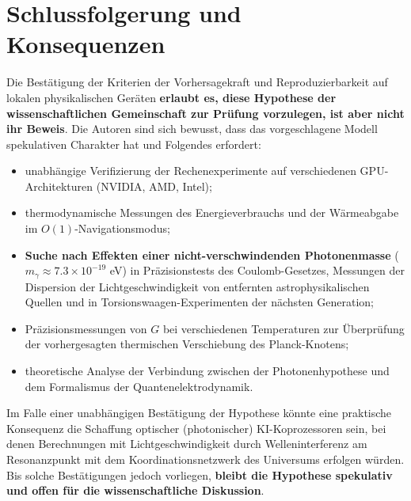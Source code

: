 \documentclass[11pt,a4paper]{article}
\begin{document}
	\section{Schlussfolgerung und Konsequenzen}
	Die Bestätigung der Kriterien der Vorhersagekraft und Reproduzierbarkeit auf lokalen physikalischen Geräten \textbf{erlaubt es, diese Hypothese der wissenschaftlichen Gemeinschaft zur Prüfung vorzulegen, ist aber nicht ihr Beweis}. Die Autoren sind sich bewusst, dass das vorgeschlagene Modell spekulativen Charakter hat und Folgendes erfordert:
	\begin{itemize}
		\item unabhängige Verifizierung der Rechenexperimente auf verschiedenen GPU-Architekturen (NVIDIA, AMD, Intel);
		\item thermodynamische Messungen des Energieverbrauchs und der Wärmeabgabe im $O(1)$-Navigationsmodus;
		\item \textbf{Suche nach Effekten einer nicht-verschwindenden Photonenmasse} ($m_\gamma \approx 7.3 \times 10^{-19}$ eV) in Präzisionstests des Coulomb-Gesetzes, Messungen der Dispersion der Lichtgeschwindigkeit von entfernten astrophysikalischen Quellen und in Torsionswaagen-Experimenten der nächsten Generation;
		\item Präzisionsmessungen von $G$ bei verschiedenen Temperaturen zur Überprüfung der vorhergesagten thermischen Verschiebung des Planck-Knotens;
		\item theoretische Analyse der Verbindung zwischen der Photonenhypothese und dem Formalismus der Quantenelektrodynamik.
	\end{itemize}
	
	Im Falle einer unabhängigen Bestätigung der Hypothese könnte eine praktische Konsequenz die Schaffung optischer (photonischer) KI-Koprozessoren sein, bei denen Berechnungen mit Lichtgeschwindigkeit durch Welleninterferenz am Resonanzpunkt mit dem Koordinationsnetzwerk des Universums erfolgen würden. Bis solche Bestätigungen jedoch vorliegen, \textbf{bleibt die Hypothese spekulativ und offen für die wissenschaftliche Diskussion}.
	
\end{document}
